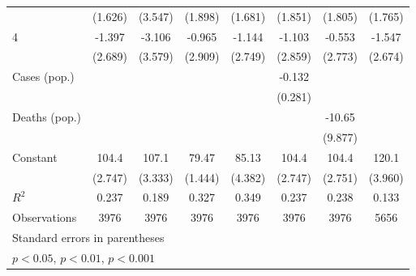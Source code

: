\documentclass{article}
\begin{document}
{\begin{longtable}{l*{7}{c}}
                &  (1.626)         &  (3.547)         &  (1.898)         &  (1.681)         &  (1.851)         &  (1.805)         &  (1.765)         \\
4               &   -1.397         &   -3.106         &   -0.965         &   -1.144         &   -1.103         &   -0.553         &   -1.547         \\
                &  (2.689)         &  (3.579)         &  (2.909)         &  (2.749)         &  (2.859)         &  (2.773)         &  (2.674)         \\
Cases (pop.)    &                  &                  &                  &                  &   -0.132         &                  &                  \\
                &                  &                  &                  &                  &  (0.281)         &                  &                  \\
Deaths (pop.)   &                  &                  &                  &                  &                  &   -10.65         &                  \\
                &                  &                  &                  &                  &                  &  (9.877)         &                  \\
Constant        &    104.4\sym{***}&    107.1\sym{***}&    79.47\sym{***}&    85.13\sym{***}&    104.4\sym{***}&    104.4\sym{***}&    120.1\sym{***}\\
                &  (2.747)         &  (3.333)         &  (1.444)         &  (4.382)         &  (2.747)         &  (2.751)         &  (3.960)         \\
\hline
\(R^{2}\)       &    0.237         &    0.189         &    0.327         &    0.349         &    0.237         &    0.238         &    0.133         \\
Observations    &     3976         &     3976         &     3976         &     3976         &     3976         &     3976         &     5656         \\
\hline\hline
\multicolumn{8}{l}{\footnotesize Standard errors in parentheses}\\
\multicolumn{8}{l}{\footnotesize \sym{*} \(p<0.05\), \sym{**} \(p<0.01\), \sym{***} \(p<0.001\)}\\
\end{longtable}
}
\end{document}
